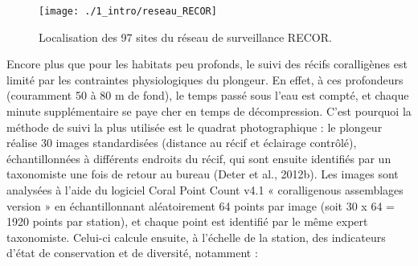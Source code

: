 \begin{figure}[H]
	\begin{center}
	\texttt{[image: ./1\_intro/reseau\_RECOR]}
		\caption[Localisation des 97 sites du réseau de surveillance RECOR]{Localisation des 97 sites du réseau de surveillance RECOR.}
	\label{figure_intro18}
\end{center}
\end{figure}

Encore plus que pour les habitats peu profonds, le suivi des récifs coralligènes est limité par les contraintes physiologiques du plongeur. En effet, à ces profondeurs (couramment 50 à 80 m de fond), le temps passé sous l’eau est compté, et chaque minute supplémentaire se paye cher en temps de décompression. C’est pourquoi la méthode de suivi la plus utilisée est le quadrat photographique : le plongeur réalise 30 images standardisées (distance au récif et éclairage contrôlé), échantillonnées à différents endroits du récif, qui sont ensuite identifiés par un taxonomiste une fois de retour au bureau (Deter et al., 2012b). Les images sont analysées à l’aide du logiciel Coral Point Count v4.1 « coralligenous assemblages version » \citep{cpce_coral_2011} en échantillonnant aléatoirement 64 points par image (soit 30 x 64 = 1920 points par station), et chaque point est identifié par le même expert taxonomiste. Celui-ci calcule ensuite, à l’échelle de la station, des indicateurs d’état de conservation et de diversité, notamment :

